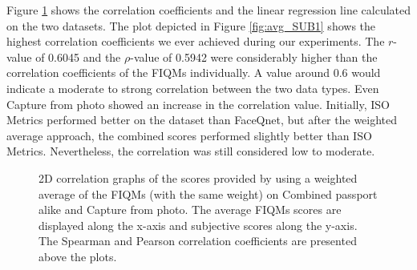 Figure \ref{fig:corrAVGvsSub} shows the correlation coefficients and the linear regression line calculated on the two datasets. The plot depicted in Figure \ref{fig:avg_SUB1} shows the highest correlation coefficients we ever achieved during our experiments. The $r$-value of 0.6045 and the $\rho$-value of 0.5942 were considerably higher than the correlation coefficients of the FIQMs individually. A value around 0.6 would indicate a moderate to strong correlation between the two data types. Even Capture from photo showed an increase in the correlation value. Initially, ISO Metrics performed better on the dataset than FaceQnet, but after the weighted average approach, the combined scores performed slightly better than ISO Metrics. Nevertheless, the correlation was still considered low to moderate. 
\begin{figure}[h]
\centering
    \caption{2D correlation graphs of the scores provided by using a weighted average of the FIQMs (with the same weight) on Combined passport alike and Capture from photo. The average FIQMs scores are displayed along the x-axis and subjective scores along the y-axis. The Spearman and Pearson correlation coefficients are presented above the plots.}
    \label{fig:corrAVGvsSub}
\end{figure}

